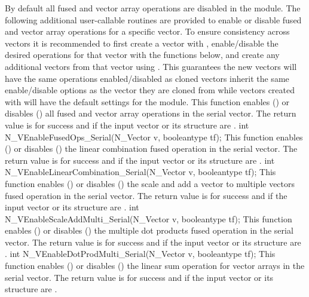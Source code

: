 By default all fused and vector array operations are disabled in the {\nvecs}
module. The following additional user-callable routines are provided to
enable or disable fused and vector array operations for a specific vector. To
ensure consistency across vectors it is recommended to first create a vector
with , enable/disable the desired operations for that vector
with the functions below, and create any additional vectors from that vector
using . This guarantees the new vectors will have the same
operations enabled/disabled as cloned vectors inherit the same enable/disable
options as the vector they are cloned from while vectors created with
 will have the default settings for the {\nvecs} module.
{
  This function enables () or disables () all fused and
  vector array operations in the serial vector. The return value is  for
  success and  if the input vector or its  structure are .
}
{
  int N\_VEnableFusedOps\_Serial(N\_Vector v, booleantype tf);
}
{
  This function enables () or disables () the linear
  combination fused operation in the serial vector. The return value is  for
  success and  if the input vector or its  structure are .
}
{
  int N\_VEnableLinearCombination\_Serial(N\_Vector v, booleantype tf);
}
{
  This function enables () or disables () the scale and
  add a vector to multiple vectors fused operation in the serial vector. The
  return value is  for success and  if the input vector or its
   structure are .
}
{
  int N\_VEnableScaleAddMulti\_Serial(N\_Vector v, booleantype tf);
}
{
  This function enables () or disables () the multiple
  dot products fused operation in the serial vector. The return value is 
  for success and  if the input vector or its  structure are
  .
}
{
  int N\_VEnableDotProdMulti\_Serial(N\_Vector v, booleantype tf);
}
{
  This function enables () or disables () the linear sum
  operation for vector arrays in the serial vector. The return value is  for
  success and  if the input vector or its  structure are .
}
